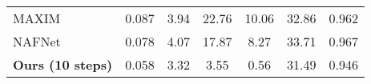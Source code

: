 \begin{table}[ht]
\begin{tabular}{lcccccc}
MAXIM~\citep{tu2022maxim}	 
& 0.087	& 3.94	& 22.76	& 10.06	& 32.86	& 0.962 \\

NAFNet~\citep{chen2022simple}	   
& 0.078	& 4.07	& 17.87	& 8.27	& \colorbox{red!15}{33.71}	& \colorbox{red!15}{0.967} \\
\cmidrule{1-7}

\textbf{Ours (10 steps)} %
& \colorbox{red!15}{0.058}	& \colorbox{red!15}{3.32}	& \colorbox{red!15}{3.55}	& \colorbox{red!15}{0.56}	& 31.49	& 0.946 \\
\bottomrule

\end{tabular}
\end{table}

